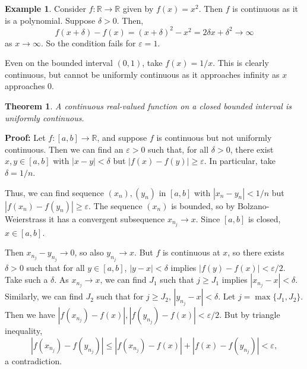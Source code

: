 \documentclass[12pt]{article}
\newtheorem{theorem}{Theorem}[section]
\theoremstyle{definition}
\newtheorem{example}{Example}[section]
\theoremstyle{remark}
\begin{document}
\begin{adjustbox}{minipage = \columnwidth - 25.5pt, margin=1em, frame=1pt, margin=0em}
\begin{example}
	Consider $f : \mathbb{R} \to \mathbb{R}$ given by $f(x) = x^2$. Then $f$ is continuous as it is a polynomial. Suppose $\delta > 0$. Then,
	\[
		f(x + \delta) - f(x) = (x + \delta)^2 - x^2 = 2 \delta x + \delta^2 \to \infty
	\]
	as $x \to \infty$. So the condition fails for $\varepsilon = 1$.

	Even on the bounded interval $(0, 1)$, take $f(x) = 1/x$. This is clearly continuous, but cannot be uniformly continuous as it approaches infinity as $x$ approaches 0.
\end{example}

\end{adjustbox}

\begin{theorem}
	A continuous real-valued function on a closed bounded interval is uniformly continuous.
\end{theorem}

\begin{adjustbox}{minipage = \columnwidth - 25.5pt, margin=1em, frame=1pt, margin=0em}
	\textbf{Proof:} Let $f : [a, b] \to \mathbb{R}$, and suppose $f$ is continuous but not uniformly continuous. Then we can find an $\varepsilon > 0$ such that, for all $\delta > 0$, there exist $x, y \in [a, b]$ with $|x - y| < \delta$ but $|f(x) - f(y)| \geq \varepsilon$. In particular, take $\delta = 1/n$.

	Thus, we can find sequence $(x_n), (y_n)$ in $[a, b]$ with $|x_n - y_n| < 1/n$ but $|f(x_n) - f(y_n)| \geq \varepsilon$. The sequence $(x_n)$ is bounded, so by Bolzano-Weierstrass it has a convergent subsequence $x_{n_j} \to x$. Since $[a, b]$ is closed, $x \in [a, b]$.

	Then $x_{n_j} - y_{n_j} \to 0$, so also $y_{n_j} \to x$. But $f$ is continuous at $x$, so there exists $\delta > 0$ such that for all $y \in [a, b]$, $|y - x| < \delta$ implies $|f(y) - f(x)| < \varepsilon/2$. Take such a $\delta$. As $x_{n_j} \to x$, we can find $J_1$ such that $j \geq J_1$ implies $|x_{n_j} - x| < \delta$. Similarly, we can find $J_2$ such that for $j \geq J_2$, $|y_{n_j} - x| < \delta$. Let $j = \max\{J_1, J_2\}$. Then we have $|f(x_{n_j}) - f(x)|, |f(y_{n_j}) - f(x)| < \varepsilon/2$. But by triangle inequality,
	\[
		|f(x_{n_j}) - f(y_{n_j})| \leq |f(x_{n_j}) - f(x)| + |f(x) - f(y_{n_j})| < \varepsilon
	,\]
	a contradiction.
\end{adjustbox}
\end{document}
